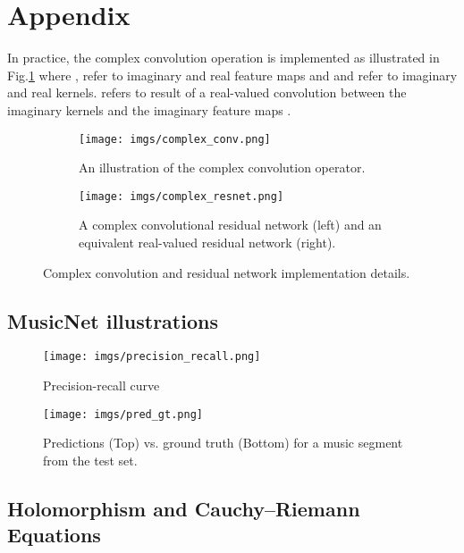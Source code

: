 \documentclass{article}
\begin{document}
\medskip

\small





\newpage

\section{Appendix} \label{appendix}
In practice, the complex convolution operation is implemented as illustrated in Fig.\ref{fig:complex_conv} where ,  refer to imaginary and real feature maps and  and  refer to imaginary and real kernels.  refers to result of a real-valued convolution between the imaginary kernels  and the imaginary feature maps .
\begin{figure}[h!]
    \begin{subfigure}[b]{0.5\linewidth}
  \centering
  \texttt{[image: imgs/complex\_conv.png]}
  \caption{An illustration of the complex convolution operator.}
    \label{fig:complex_conv}
    \end{subfigure}
    \quad
    \begin{subfigure}[b]{0.5\linewidth}
  \centering
  \texttt{[image: imgs/complex\_resnet.png]}
  \caption{A complex convolutional residual network (left) and an equivalent real-valued      			 residual network (right).}
    \label{fig:complex_resnet}
    \end{subfigure}
    \caption{Complex convolution and residual network implementation details.}
\end{figure}

\subsection{MusicNet illustrations}

\begin{figure}[h]
\centering
  \texttt{[image: imgs/precision\_recall.png]}
  \caption{Precision-recall curve}
  \label{fig:music_precision_recall}
\end{figure}

\begin{figure}[h]
\centering
  \texttt{[image: imgs/pred\_gt.png]}
\caption{Predictions (Top) vs. ground truth (Bottom) for a music segment from the test set.}
\label{fig:music_pred}
\label{fig:music}
\end{figure}

\subsection{Holomorphism and Cauchy–Riemann Equations}\label{appendixholomorphism}
\end{document}
